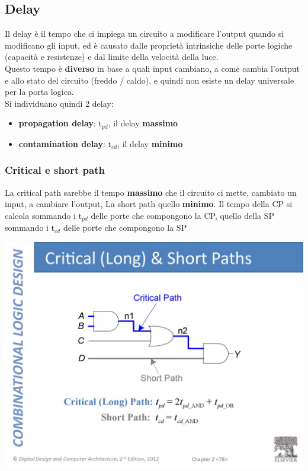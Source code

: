 \documentclass{report}
\begin{document}
    \subsection{Delay}
        Il delay è il tempo che ci impiega un circuito a modificare l'output quando
        si modificano gli input, ed è causato dalle proprietà intrinsiche delle porte logiche (capacità e resistenze) e 
        dal limite della velocità della luce. \\
        Questo tempo è \textbf{diverso} in base a quali input cambiano, a come cambia l'output e 
        allo stato del circuito (freddo / caldo), e quindi non esiste un delay universale per la porta logica. \\
        Si individuano quindi 2 delay:
        \begin{itemize}
            \item \textbf{propagation delay}: t$_{pd}$, il delay \textbf{massimo}
            \item \textbf{contamination delay}: t$_{cd}$, il delay \textbf{minimo}
        \end{itemize}
        \subsubsection{Critical e short path}
            La critical path sarebbe il tempo \textbf{massimo} che il circuito ci mette, cambiato 
            un input, a cambiare l'output, La short path quello \textbf{minimo}.
            Il tempo della CP si calcola sommando i t$_{pd}$ delle porte che compongono la CP,
            quello della SP sommando i t$_{cd}$ delle porte che compongono la SP
            \begin{center}
                \includegraphics[width=\textwidth]{path.jpg}
            \end{center}
        
\end{document}

